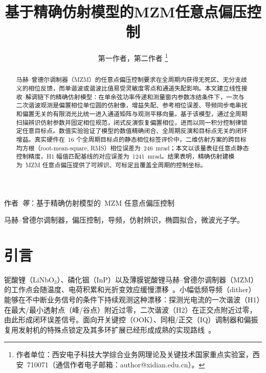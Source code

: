 \documentclass[journal]{IEEEtran}
\theoremstyle{plain}
\theoremstyle{remark}
\begin{document}
\title{基于精确仿射模型的MZM任意点偏压控制}

\author{第一作者，第二作者%
\thanks{作者单位：西安电子科技大学综合业务网理论及关键技术国家重点实验室，西安~710071（通信作者电子邮箱：author@xidian.edu.cn）。}}

%
{作者~\MakeLowercase{\textit{等}}：基于精确仿射模型的~MZM 任意点偏压控制}

\maketitle

\begin{abstract}
马赫--曾德尔调制器（MZM）的任意点偏压控制要求在全周期内获得无死区、无分支歧义的相位反馈，而单谐波或谐波比值易受灵敏度零点和通道失配影响。本文建立线性接收--解调链下的精确仿射模型：在单余弦功率传递和测量窗内参数冻结条件下，一次与二次谐波观测是偏置相位单位圆的仿射像，增益失配、参考相位误差、导频同步电串扰和偏置无关的有限消光比统一进入通道矩阵与观测平移向量。基于该模型，通过全周期扫描辨识仿射参数并固定相位规范，闭式反演恢复偏置相位，进而以同一积分控制律锁定任意目标点。数值实验验证了模型的数值精确闭合、全周期反演和目标点无关的闭环增益。真实硬件在~16 个全周期目标点的静态相位标签评价中，二维仿射方案的跨目标均方根（root-mean-square, RMS）相位误差为~246~mrad；本文以该量表征任意点静态控制精度，H1 幅值匹配基线的对应误差为~1241~mrad。结果表明，精确仿射建模为~MZM 任意点偏压提供了可辨识、可标定且覆盖全周期的控制坐标。
\end{abstract}

\begin{IEEEkeywords}
马赫--曾德尔调制器，偏压控制，导频，仿射辨识，椭圆拟合，微波光子学。
\end{IEEEkeywords}

\IEEEpeerreviewmaketitle
\setlength{\emergencystretch}{2em}

\section{引言}
铌酸锂（LiNbO$_3$）、磷化铟（InP）以及薄膜铌酸锂马赫--曾德尔调制器（MZM）的工作点会随温度、电荷积累和光折变效应缓慢漂移~\cite{salvestrini2011,chen2011,wang2018,wang2022}。小幅低频导频（dither）能够在不中断业务信号的条件下持续观测这种漂移：探测光电流的一次谐波（H1）在最大/最小透射点（峰/谷点）附近过零，二次谐波（H2）在正交点附近过零，由此形成闭环误差信号。面向开关键控（OOK）、同相/正交（IQ）调制器和偏振复用发射机的特殊点锁定及其多环扩展已经形成成熟的实现路线~\cite{cho2006,sotoodeh2011,kawakami2012,fu2013,li2017}。
\end{document}
